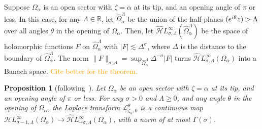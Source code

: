 \documentclass{article}
\let\Re\relax
\DeclareMathOperator{\Re}{Re}
\newcommand{\singexp}[2]{\mathcal{H}L^\infty_{#1, #2}}
\newcommand{\singexpalg}[1]{\singexp{#1}{\bullet}}
\newcommand{\dualsingexp}[2]{\widehat{\mathcal{H}}L^\infty_{#1, #2}}
\newcommand{\R}{\mathbb{R}}
\newcommand{\laplace}{\mathcal{L}}
\theoremstyle{definition}
\theoremstyle{plain}
\newtheorem{prop}[definition]{Proposition}
\begin{document}
\color{RoyalBlue}{$\singexpalg{\sigma}(\Omega_\alpha^\Lambda)$}
\color{Maroon}
Suppose $\Omega_\alpha$ is an open sector with $\zeta = \alpha$ at its tip, and an opening angle of $\pi$ or less. In this case, for any $\Lambda \in \R$, let $\widehat{\Omega}_\alpha^\Lambda$ be the union of the half-planes $\Re(e^{i\theta} z) > \Lambda$ over all angles $\theta$ in the opening of $\Omega_\alpha$. Then, let $\dualsingexp{\sigma}{\Lambda}(\widehat{\Omega}_\alpha^\Lambda)$ be the space of holomorphic functions $F$ on $\widehat{\Omega}_\alpha^\Lambda$ with $|F| \lesssim \Delta^\sigma$, where $\Delta$ is the distance to the boundary of $\widehat{\Omega}_\alpha^\Lambda$. The norm $\|F\|_{\sigma, \Lambda} = \sup_{\widehat{\Omega}_\alpha^\Lambda} \Delta^{-\sigma} |F|$ turns $\dualsingexp{\sigma}{\Lambda}(\Omega_\alpha)$ into a Banach space. \textcolor{orange}{Cite \cite{sternin1995borel} better for the theorem.}
\begin{prop}[following~\cite{sternin1995borel}]\label{prop:laplace-cont}
Let $\Omega_\alpha$ be an open sector with $\zeta = \alpha$ at its tip, and an opening angle of $\pi$ or less. For any $\sigma > 0$ and $\Lambda \ge 0$, and any angle $\theta$ in the opening of $\Omega_\alpha$, the Laplace transform $\laplace_{\zeta_\alpha, 0}^\theta$ is a continuous map $\singexp{\sigma-1}{\Lambda}(\Omega_\alpha) \to \dualsingexp{-\sigma}{\Lambda}(\Omega_\alpha)$, with a norm of at most $\Gamma(\sigma)$.
\end{prop}
\end{document}
